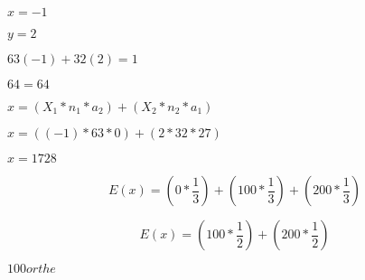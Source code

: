 \documentclass[10pt]{book}
\begin{document}
\begin{mdSnippets}
\begin{mdInlineSnippet}[7c477670495296c99a5898d116e275fc]
$x = -1$\end{mdInlineSnippet}%
\begin{mdInlineSnippet}[5f08418eb7c8408d717c2e2fe422ab3c]%
$y = 2$\end{mdInlineSnippet}%
\begin{mdInlineSnippet}[486403d69ed67c2c47243be9dbed6f83]%
$63(-1) + 32(2) = 1$\end{mdInlineSnippet}%
\begin{mdInlineSnippet}[d9c1da9e08cb0b4e2fe07dd36883dc9b]%
$64 = 64$\end{mdInlineSnippet}%
\begin{mdInlineSnippet}[49507d99d5c48e065a155a4a7acfa970]%
$x = (X_1 * n_1 * a_2) + (X_2 * n_2 * a_1)$\end{mdInlineSnippet}%
\begin{mdInlineSnippet}[38f1149d8d903f4fa7c3b6871905ece0]%
$x = ((-1) * 63 * 0) + (2 * 32 * 27)$\end{mdInlineSnippet}%
\begin{mdInlineSnippet}[1bbfc0067d3cc3321ba2682f0f4207d9]%
$x = 1728$\end{mdInlineSnippet}%
\begin{mdDisplaySnippet}[b4236f6f002d471f64c27927560a1a95]%
\[%
E(x) = (0 * \frac{1} {3}) + (100 * \frac{1} {3}) + (200 * \frac{1} {3})
\]%
\end{mdDisplaySnippet}%
\begin{mdDisplaySnippet}[8d665ad1743590c0d694bd990187d640]%
\[%
E(x) = (100 * \frac{1} {2}) + (200 * \frac{1} {2})
\]%
\end{mdDisplaySnippet}%
\begin{mdInlineSnippet}[139143a3391fd2d07385c60f613b71cf]%
$100 or the $\end{mdInlineSnippet}%

\end{mdSnippets}
\end{document}
